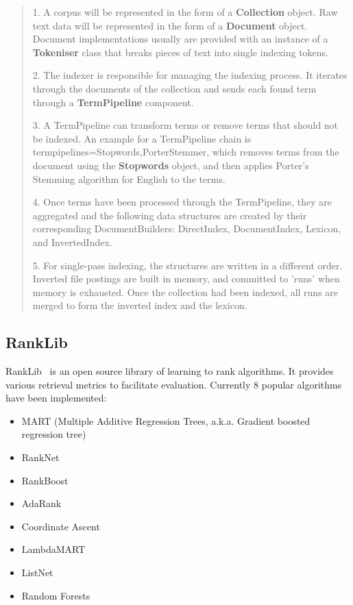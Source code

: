 \begin{quotation}
 \item 1. A corpus will be represented in the form of a \textbf{Collection} object. Raw text data will be represented in the form of a \textbf{Document} object. 
 Document implementations usually are provided with an instance of a \textbf{Tokeniser} class that breaks pieces of text into single indexing tokens.
 \item 2. The indexer is responsible for managing the indexing process. It iterates through the documents of the collection and sends each found 
 term through a \textbf{TermPipeline} component.
 \item 3. A TermPipeline can transform terms or remove terms that should not be indexed. An example for a TermPipeline chain is 
 termpipelines=Stopwords,PorterStemmer, which removes terms from the document using the \textbf{Stopwords} object, and then applies Porter's Stemming algorithm 
 for English to the terms.
 \item 4. Once terms have been processed through the TermPipeline, they are aggregated and the following data structures are created by their corresponding 
 DocumentBuilders: DirectIndex, DocumentIndex, Lexicon, and InvertedIndex.
 \item 5. For single-pass indexing, the structures are written in a different order. Inverted file postings are built in memory, and committed to 'runs' 
 when memory is exhausted. Once the collection had been indexed, all runs are merged to form the inverted index and the lexicon.
\end{quotation}

\subsection{RankLib}\label{section:rankLib}
RankLib~\cite{ranklib} is an open source library of learning to rank algorithms. It provides various retrieval metrics to facilitate evaluation.
Currently 8 popular algorithms have been implemented:
\begin{itemize}
 \item MART (Multiple Additive Regression Trees, a.k.a. Gradient boosted regression tree)
 \item RankNet
 \item RankBoost
 \item AdaRank
 \item Coordinate Ascent
 \item LambdaMART
 \item ListNet
 \item Random Forests
\end{itemize}

